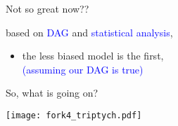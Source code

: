%
%
\begin{lhframe}[rhgraphic={\texttt{[image: fork4\_reg1.png]}}]
	{Not so great now??}
	
	based on \textcolor{blue}{DAG} and \textcolor{blue}{statistical analysis},
	\begin{itemize}
		\item the less biased model is the first, \\
		{\small \textcolor{blue}{(assuming our DAG is true)} }
	\end{itemize}
\end{lhframe}
%
%
\begin{frame}
	{So, what is going on?}
	
	\begin{figure*}
		\texttt{[image: fork4\_triptych.pdf]}
	\end{figure*}
\end{frame}
%
%
